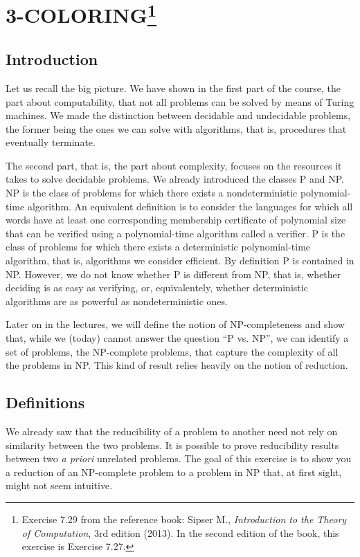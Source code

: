 \section{3-COLORING\footnote{%
Exercise 7.29 from the reference book: Sipser M.,
\emph{Introduction to the Theory of Computation}, 3rd edition (2013).
In the second edition of the book, this exercise is Exercise 7.27.}}

\subsection{Introduction}

Let us recall the big picture. We have shown in the first part of the course,
the part about computability, that not all problems can be solved by means of
Turing machines. We made the distinction between decidable and undecidable
problems, the former being the ones we can solve with algorithms, that is,
procedures that eventually terminate.

The second part, that is, the part about complexity, focuses on the resources
it takes to solve decidable problems. We already introduced the classes P and
NP\@. NP is the class of problems for which there exists a nondeterministic
polynomial-time algorithm. An equivalent definition is to consider the
languages for which all words have at least one corresponding membership
certificate of polynomial size that can be verified using a polynomial-time
algorithm called a verifier. P is the class of problems for which there exists
a deterministic polynomial-time algorithm, that is, algorithms we consider
efficient. By definition P is contained in NP\@.
However, we do not know whether P is different from NP, that is, whether
deciding is as easy as verifying, or, equivalentely, whether deterministic
algorithms are as powerful as nondeterministic ones.

Later on in the lectures, we will define the notion of NP-completeness and show
that, while we (today) cannot answer the question ``P vs. NP'', we can identify
a set of problems, the NP-complete problems, that capture the complexity of all
the problems in NP\@. This kind of result relies heavily on the notion of
reduction.

\subsection{Definitions}

We already saw that the reducibility of a problem to
another need not rely on similarity between the two problems. It is
possible to prove reducibility results between two \emph{a priori} unrelated problems.
The goal of this exercise is to show you a reduction of an NP-complete
problem to a problem in NP that, at first sight, might not seem intuitive.

